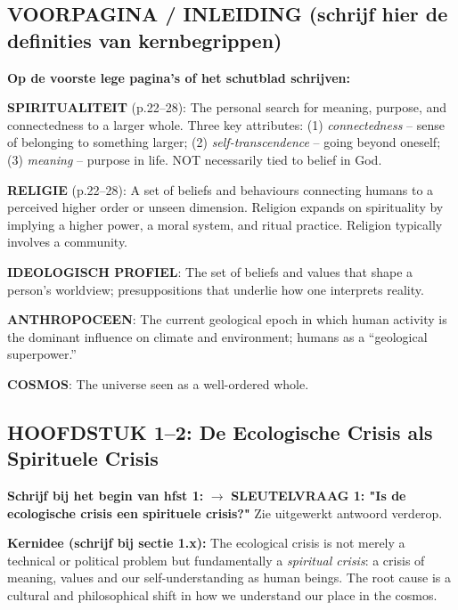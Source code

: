 \documentclass[a4paper,10pt]{article}
\begin{document}
\vspace{3pt}

\subsection{VOORPAGINA / INLEIDING (schrijf hier de definities van kernbegrippen)}

\textbf{Op de voorste lege pagina's of het schutblad schrijven:}

\textbf{SPIRITUALITEIT} (p.22--28): The personal search for meaning, purpose, and connectedness to a larger whole. Three key attributes: (1) \textit{connectedness} -- sense of belonging to something larger; (2) \textit{self-transcendence} -- going beyond oneself; (3) \textit{meaning} -- purpose in life. NOT necessarily tied to belief in God.

\textbf{RELIGIE} (p.22--28): A set of beliefs and behaviours connecting humans to a perceived higher order or unseen dimension. Religion expands on spirituality by implying a higher power, a moral system, and ritual practice. Religion typically involves a community.

\textbf{IDEOLOGISCH PROFIEL}: The set of beliefs and values that shape a person's worldview; presuppositions that underlie how one interprets reality.

\textbf{ANTHROPOCEEN}: The current geological epoch in which human activity is the dominant influence on climate and environment; humans as a ``geological superpower.''

\textbf{COSMOS}: The universe seen as a well-ordered whole.

\vspace{3pt}

\subsection{HOOFDSTUK 1--2: De Ecologische Crisis als Spirituele Crisis}

\textbf{Schrijf bij het begin van hfst 1:} $\to$ \textbf{SLEUTELVRAAG 1: "Is de ecologische crisis een spirituele crisis?"} Zie uitgewerkt antwoord verderop.

\textbf{Kernidee (schrijf bij sectie 1.x):} The ecological crisis is not merely a technical or political problem but fundamentally a \textit{spiritual crisis}: a crisis of meaning, values and our self-understanding as human beings. The root cause is a cultural and philosophical shift in how we understand our place in the cosmos.
\end{document}
